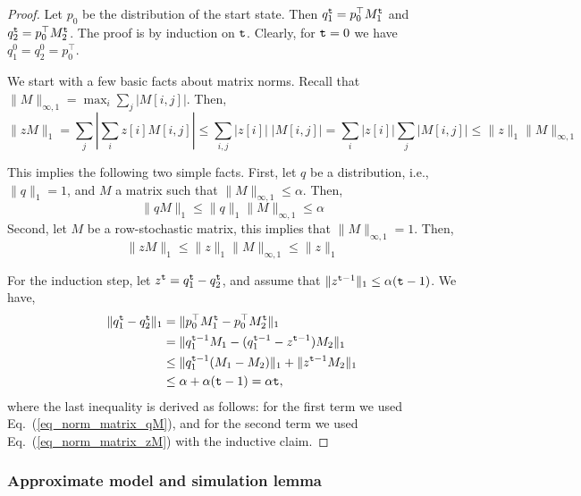 \begin{proof}
Let $p_0$ be the distribution of the start state. Then
$q_1^{\tt t}=p_0^\top M_1^{\tt t}$ and $q_2^{\tt t}=p_0^\top
M_2^{\tt t}$. The proof is by induction on ${\tt t}$. Clearly, for
${\tt t}=0$ we have $q_1^0=q_2^0=p_0^\top$.

We start with a few basic facts about matrix norms. Recall that
$\|M\|_{\infty,1} = \max_i \sum_j |M[i,j]|$. Then,
\begin{equation}
\label{eq_norm_matrix_1}
%
\| z M\|_1 = \sum_j | \sum_i z[i] M[i,j]|\leq \sum_{i,j} |z[i]|\;
|M[i,j] | = \sum_i |z[i]| \sum_j  |M[i,j]| \leq \|z\|_1
\|M\|_{\infty,1}
\end{equation}

This implies the following two simple facts. First, let $q$ be a
distribution, i.e., $\|q\|_1=1$, and $M$ a matrix such that
$\|M\|_{\infty,1} \leq \alpha $. Then,
\begin{equation}
\label{eq_norm_matrix_qM} \|qM\|_1 \leq \|q\|_1 \|M\|_{\infty,1}
 \leq \alpha
\end{equation}
Second, let $M$ be a row-stochastic matrix, this implies that
$\|M\|_{\infty,1}=1$. Then,
\begin{equation}
\label{eq_norm_matrix_zM} \|zM\|_1 \leq \|z\|_1 \|M\|_{\infty,1}
\leq \|z\|_1
\end{equation}

For the induction step, let $z^{\tt t}=q_1^{\tt t}-q_2^{\tt t}$, and assume that 
$\|z^{{\tt t}-1}\|_1 \leq \alpha ({\tt t}-1)$. We
have,
\begin{align*}
\|q_1^{\tt t}-q_2^{\tt t}\|_1 &= \|p_0^\top M_1^{\tt t}-p_0^\top M_2^{\tt t}\|_1\\
&= \|q_1^{{\tt t}-1}M_1 - (q_1^{{\tt t}-1}-z^{{\tt t}-1})M_2\|_1\\
&\leq \|q_1^{{\tt t}-1} (M_1-M_2)\|_1 + \|z^{{\tt t}-1}M_2\|_1\\
&\leq \alpha + \alpha ({\tt t}-1) = \alpha{\tt t},
\end{align*}
where the last inequality is derived as follows: for the first
term we used Eq.~(\ref{eq_norm_matrix_qM}), and for the second term we
used Eq.~(\ref{eq_norm_matrix_zM}) with the inductive claim.
\end{proof}

\subsubsection{Approximate model and simulation lemma}

